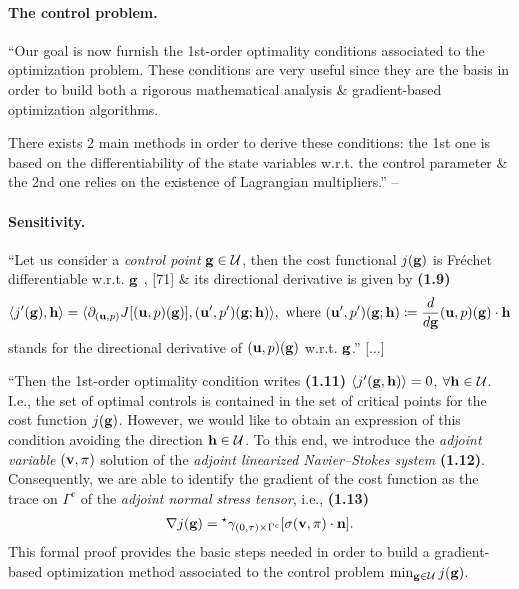 \documentclass[oneside]{book}
\numberwithin{equation}{section}
\begin{document}
\paragraph{The control problem.} ``Our goal is now furnish the 1st-order optimality conditions associated to the optimization problem. These conditions are very useful since they are the basis in order to build both a rigorous mathematical analysis \& gradient-based optimization algorithms.

There exists 2 main methods in order to derive these conditions: the 1st one is based on the differentiability of the state variables w.r.t. the control parameter \& the 2nd one relies on the existence of Lagrangian multipliers.'' -- \cite[Chap. 1, Subsect. 1.4.1, p. 10]{Moubachir_Zolesio2006}

\paragraph{Sensitivity.} ``Let us consider a \textit{control point} ${\bf g}\in\mathcal{U}$, then the cost functional $j({\bf g})$ is Fr\'echet differentiable w.r.t. ${\bf g}$ \cite{Abergel_Temam1990}, [71] \& its directional derivative is given by \textbf{(1.9)}
\begin{align*}
	\langle j'({\bf g}),{\bf h}\rangle = \langle\partial_{({\bf u},p)}J[({\bf u},p)({\bf g})],({\bf u}',p')({\bf g};{\bf h})\rangle,\mbox{ where }({\bf u}',p')({\bf g};{\bf h})\coloneqq\frac{d}{d{\bf g}}({\bf u},p)({\bf g})\cdot{\bf h}
\end{align*}
stands for the directional derivative of $({\bf u},p)({\bf g})$ w.r.t. ${\bf g}$.'' [$\ldots$]

``Then the 1st-order optimality condition writes \textbf{(1.11)} $\langle j'({\bf g},{\bf h})\rangle = 0$, $\forall{\bf h}\in\mathcal{U}$. I.e., the set of optimal controls is contained in the set of critical points for the cost function $j({\bf g})$. However, we would like to obtain an expression of this condition avoiding the direction ${\bf h}\in\mathcal{U}$. To this end, we introduce the \textit{adjoint variable} $({\bf v},\pi)$ solution of the \textit{adjoint linearized Navier--Stokes system} \textbf{(1.12)}. Consequently, we are able to identify the gradient of the cost function as the trace on $\Gamma^c$ of the \textit{adjoint normal stress tensor}, i.e., \textbf{(1.13)}
\begin{align*}
	\nabla j({\bf g}) = {}^\star\gamma_{(0,\tau)\times\Gamma^c}[\sigma({\bf v},\pi)\cdot{\bf n}].
\end{align*}
This formal proof provides the basic steps needed in order to build a gradient-based optimization method associated to the control problem $\min_{{\bf g}\in\mathcal{U}} j({\bf g})$.
\end{document}
